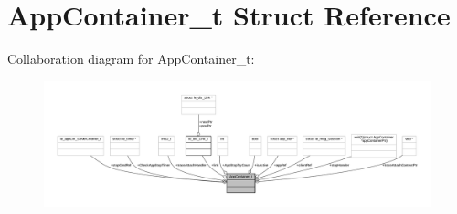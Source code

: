 \hypertarget{struct_app_container__t}{}\section{App\+Container\+\_\+t Struct Reference}
\label{struct_app_container__t}


Collaboration diagram for App\+Container\+\_\+t\+:
\nopagebreak
\begin{figure}[H]
\begin{center}
\leavevmode
\includegraphics[width=350pt]{struct_app_container__t__coll__graph}
\end{center}
\end{figure}
